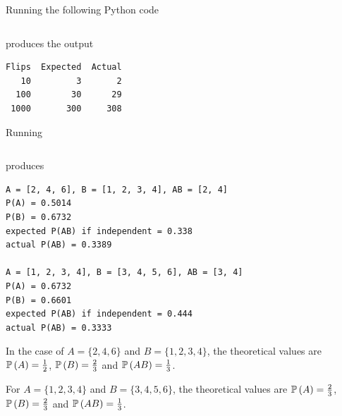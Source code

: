 \begin{ex}
  Running the following Python code
  \inputminted{python}{./src/01-22.py}
  produces the output
  \begin{verbatim}
Flips  Expected  Actual
   10         3       2
  100        30      29
 1000       300     308
  \end{verbatim}
\end{ex}

\begin{ex}
  Running
  \inputminted{python}{./src/01-23.py}
  produces
  \begin{verbatim}
A = [2, 4, 6], B = [1, 2, 3, 4], AB = [2, 4]
P(A) = 0.5014
P(B) = 0.6732
expected P(AB) if independent = 0.338
actual P(AB) = 0.3389

A = [1, 2, 3, 4], B = [3, 4, 5, 6], AB = [3, 4]
P(A) = 0.6732
P(B) = 0.6601
expected P(AB) if independent = 0.444
actual P(AB) = 0.3333
\end{verbatim}

  In the case of $A=\{2, 4, 6\}$ and $B=\{1, 2, 3, 4\}$, the theoretical values are
  $\P{A}=\frac{1}{2}$, $\P{B}=\frac{2}{3}$ and $\P{AB}=\frac{1}{3}$.

  For $A=\{1, 2, 3, 4\}$ and $B=\{3, 4, 5, 6\}$, the theoretical values are
  $\P{A}=\frac{2}{3}$, $\P{B}=\frac{2}{3}$ and $\P{AB}=\frac{1}{3}$.
\end{ex}